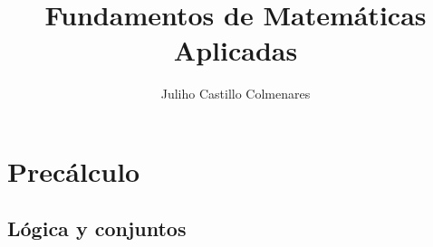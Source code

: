 \documentclass[
twoside,
12pt,
letterpaper
]{amsbook}
\title{Fundamentos de Matemáticas Aplicadas}
\author[J. Castillo]{Juliho Castillo Colmenares}
\begin{document}
	\maketitle
	\tableofcontents


\part{Precálculo}

\chapter{Lógica y conjuntos}

%
%
%
%
%
%
%
%
%
%
%
%
%
%
%
%
%
%
%
%
%
%
%
%
%
%
%
%
%
%
%
%
%
%
%
\end{document}
